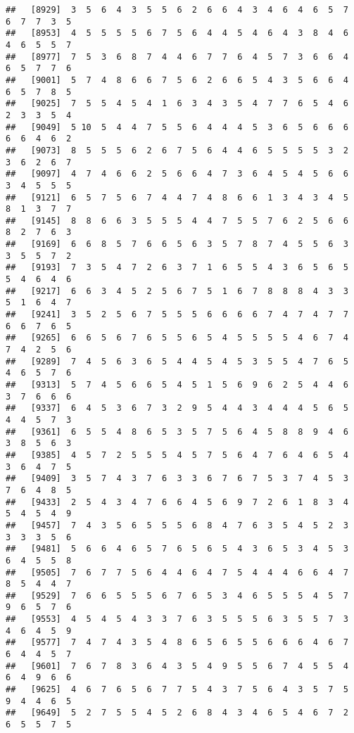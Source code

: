 \documentclass[
]{book}
\begin{document}
\begin{verbatim}
##   [8929]  3  5  6  4  3  5  5  6  2  6  6  4  3  4  6  4  6  5  7  6  7  7  3  5
##   [8953]  4  5  5  5  5  6  7  5  6  4  4  5  4  6  4  3  8  4  6  4  6  5  5  7
##   [8977]  7  5  3  6  8  7  4  4  6  7  7  6  4  5  7  3  6  6  4  6  5  7  7  6
##   [9001]  5  7  4  8  6  6  7  5  6  2  6  6  5  4  3  5  6  6  4  6  5  7  8  5
##   [9025]  7  5  5  4  5  4  1  6  3  4  3  5  4  7  7  6  5  4  6  2  3  3  5  4
##   [9049]  5 10  5  4  4  7  5  5  6  4  4  4  5  3  6  5  6  6  6  6  6  4  6  2
##   [9073]  8  5  5  5  6  2  6  7  5  6  4  4  6  5  5  5  5  3  2  3  6  2  6  7
##   [9097]  4  7  4  6  6  2  5  6  6  4  7  3  6  4  5  4  5  6  6  3  4  5  5  5
##   [9121]  6  5  7  5  6  7  4  4  7  4  8  6  6  1  3  4  3  4  5  8  1  3  7  7
##   [9145]  8  8  6  6  3  5  5  5  4  4  7  5  5  7  6  2  5  6  6  8  2  7  6  3
##   [9169]  6  6  8  5  7  6  6  5  6  3  5  7  8  7  4  5  5  6  3  3  5  5  7  2
##   [9193]  7  3  5  4  7  2  6  3  7  1  6  5  5  4  3  6  5  6  5  5  4  6  4  6
##   [9217]  6  6  3  4  5  2  5  6  7  5  1  6  7  8  8  8  4  3  3  5  1  6  4  7
##   [9241]  3  5  2  5  6  7  5  5  5  6  6  6  6  7  4  7  4  7  7  6  6  7  6  5
##   [9265]  6  6  5  6  7  6  5  5  6  5  4  5  5  5  5  4  6  7  4  7  4  2  5  6
##   [9289]  7  4  5  6  3  6  5  4  4  5  4  5  3  5  5  4  7  6  5  4  6  5  7  6
##   [9313]  5  7  4  5  6  6  5  4  5  1  5  6  9  6  2  5  4  4  6  3  7  6  6  6
##   [9337]  6  4  5  3  6  7  3  2  9  5  4  4  3  4  4  4  5  6  5  4  4  5  7  3
##   [9361]  6  5  5  4  8  6  5  3  5  7  5  6  4  5  8  8  9  4  6  3  8  5  6  3
##   [9385]  4  5  7  2  5  5  5  4  5  7  5  6  4  7  6  4  6  5  4  3  6  4  7  5
##   [9409]  3  5  7  4  3  7  6  3  3  6  7  6  7  5  3  7  4  5  3  7  6  4  8  5
##   [9433]  2  5  4  3  4  7  6  6  4  5  6  9  7  2  6  1  8  3  4  5  4  5  4  9
##   [9457]  7  4  3  5  6  5  5  5  6  8  4  7  6  3  5  4  5  2  3  3  3  3  5  6
##   [9481]  5  6  6  4  6  5  7  6  5  6  5  4  3  6  5  3  4  5  3  6  4  5  5  8
##   [9505]  7  6  7  7  5  6  4  4  6  4  7  5  4  4  4  6  6  4  7  8  5  4  4  7
##   [9529]  7  6  6  5  5  5  6  7  6  5  3  4  6  5  5  5  4  5  7  9  6  5  7  6
##   [9553]  4  5  4  5  4  3  3  7  6  3  5  5  5  6  3  5  5  7  3  4  6  4  5  9
##   [9577]  7  4  7  4  3  5  4  8  6  5  6  5  5  6  6  6  4  6  7  6  4  4  5  7
##   [9601]  7  6  7  8  3  6  4  3  5  4  9  5  5  6  7  4  5  5  4  6  4  9  6  6
##   [9625]  4  6  7  6  5  6  7  7  5  4  3  7  5  6  4  3  5  7  5  9  4  4  6  5
##   [9649]  5  2  7  5  5  4  5  2  6  8  4  3  4  6  5  4  6  7  2  6  5  5  7  5

\end{verbatim}
\end{document}
